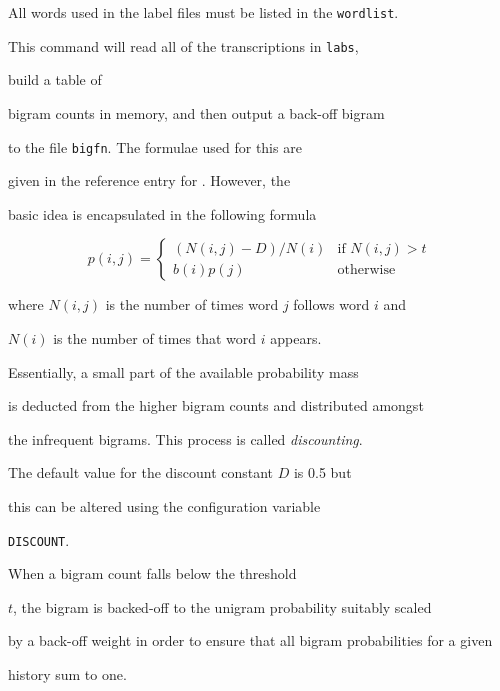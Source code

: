 All words used in the label files must be listed in the \texttt{wordlist}.


This command will read all of the transcriptions in \texttt{labs},


build a table of


bigram counts in memory, and then output a back-off bigram


to the file \texttt{bigfn}.  The formulae used for this are


given in the reference entry for .  However, the 


basic idea is encapsulated in the following formula


\[


   p(i,j) = \left\{


      \begin{array}{ll}


           (N(i,j) - D )/N(i) & \mbox{if $N(i,j) > t$} \\


                  b(i) p(j)  & \mbox{otherwise}


       \end{array}


   \right. 


\]


where $N(i,j)$ is the number of times word $j$ follows word $i$ and


$N(i)$ is the number of times that word $i$ appears.


Essentially, a small part of the available probability mass


is deducted from the higher bigram counts and distributed amongst


the infrequent bigrams.  This process is called \textit{discounting}.


The default value for the discount constant $D$ is 0.5 but 


this can be altered using the configuration variable 


\texttt{DISCOUNT}.


When a bigram count falls below the threshold


$t$, the bigram is backed-off to the unigram probability suitably scaled


by a back-off weight in order to ensure that all bigram probabilities for a given


history sum to one.





